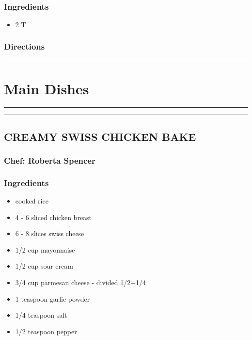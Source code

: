 \documentclass[
]{book}
\providecommand{\tightlist}{%
  \setlength{\itemsep}{0pt}\setlength{\parskip}{0pt}}
\begin{document}
\hypertarget{ingredients-38}{%
\subsection*{Ingredients}\label{ingredients-38}}


\begin{itemize}
\tightlist
\item
  2 T
\end{itemize}

\hypertarget{directions-38}{%
\subsection*{Directions}\label{directions-38}}


\begin{center}\rule{0.5\linewidth}{0.5pt}\end{center}

\hypertarget{Main}{%
\chapter{Main Dishes}\label{Main}}

\begin{center}\rule{0.5\linewidth}{0.5pt}\end{center}

\begin{center}\rule{0.5\linewidth}{0.5pt}\end{center}

\hypertarget{creamy-swiss-chicken-bake}{%
\section*{CREAMY SWISS CHICKEN BAKE}\label{creamy-swiss-chicken-bake}}


\hypertarget{chef-roberta-spencer-12}{%
\subsection*{Chef: Roberta Spencer}\label{chef-roberta-spencer-12}}


\hypertarget{ingredients-39}{%
\subsection*{Ingredients}\label{ingredients-39}}


\begin{itemize}
\tightlist
\item
  cooked rice
\item
  4 - 6 sliced chicken breast
\item
  6 - 8 slices swiss cheese
\item
  1/2 cup mayonnaise
\item
  1/2 cup sour cream
\item
  3/4 cup parmesan cheese - divided 1/2+1/4
\item
  1 teaspoon garlic powder
\item
  1/4 teaspoon salt
\item
  1/2 teaspoon pepper
\end{itemize}
\end{document}
